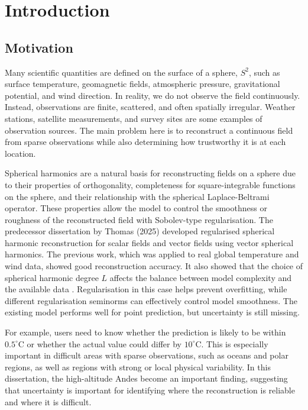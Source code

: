 \chapter{Introduction}
\label{ch:intro}

\section{Motivation}

Many scientific quantities are defined on the surface of a sphere, $S^2$, such as surface temperature, geomagnetic fields, atmospheric pressure, gravitational potential, and wind direction. In reality, we do not observe the field continuously. Instead, observations are finite, scattered, and often spatially irregular. Weather stations, satellite measurements, and survey sites are some examples of observation sources. The main problem here is to reconstruct a continuous field from sparse observations while also determining how trustworthy it is at each location.

Spherical harmonics are a natural basis for reconstructing fields on a sphere due to their properties of orthogonality, completeness for square-integrable functions on the sphere, and their relationship with the spherical Laplace-Beltrami operator. These properties allow the model to control the smoothness or roughness of the reconstructed field with Sobolev-type regularisation. The predecessor dissertation by Thomas (2025) developed regularised spherical harmonic reconstruction for scalar fields and vector fields using vector spherical harmonics. The previous work, which was applied to real global temperature and wind data, showed good reconstruction accuracy. It also showed that the choice of spherical harmonic degree $L$ affects the balance between model complexity and the available data \citep{thomas2025}. Regularisation in this case helps prevent overfitting, while different regularisation seminorms can effectively control model smoothness. The existing model performs well for point prediction, but uncertainty is still missing.

For example, users need to know whether the prediction is likely to be within $0.5^\circ\mathrm{C}$ or whether the actual value could differ by $10^\circ\mathrm{C}$. This is especially important in difficult areas with sparse observations, such as oceans and polar regions, as well as regions with strong or local physical variability. In this dissertation, the high-altitude Andes become an important finding, suggesting that uncertainty is important for identifying where the reconstruction is reliable and where it is difficult.

